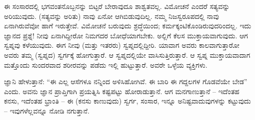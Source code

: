 \vskip 6pt

ಈ ಸಂಸಾರದಲ್ಲಿ ಭಗವಂತನೊಬ್ಬನನ್ನು ಬಿಟ್ಟರೆ ಬೇರಾವುದೂ ಶಾಶ್ವತವಲ್ಲ. ವಿಮೋಚನೆ ಎಂದರೆ ಸತ್ಯವನ್ನು ಅರಿಯುವುದು. (ಸತ್ಯವನ್ನು ಅರಿತು) ನಾವು ಏನೋ ಆಗಿಬಿಡುವುದಿಲ್ಲ. ನಮ್ಮ ನಿಜಸ್ವರೂಪದಲ್ಲಿ ನಾವು ಏನಾಗಿರುವೆವೋ ಹಾಗೆ ಇರುತ್ತೇವೆ. ವಿಮೋಚನೆ ಬರುವುದು ಶ್ರದ್ಧೆಯಿಂದ; ಕರ್ಮಕ್ಕಂಟಿಕೊಂಡಿರುವುದರಿಂದಲ್ಲ. ಇದು ಜ್ಞಾನದ ಪ್ರಶ್ನೆ! ನೀವು ಏನಾಗಿದ್ದೀರೋ ನಿಮಗದರ ಬೋಧೆಯಾಗಬೇಕು. ಅಲ್ಲಿಗೆ ಕೆಲಸ ಮುಕ್ತಾಯವಾಗುವುದು. ಆಗ ಸ್ವಪ್ನವು ಕಳೆಯುವುದು. ಈಗ ನೀವು (ಮತ್ತು ಇತರರು) ಸ್ವಪ್ನದಲ್ಲಿದ್ದೀರಿ. ಯಾವಾಗ ಅವರು ಕಾಲವಾಗುತ್ತಾರೋ ಅವರು ತಮ್ಮ (ಸ್ವಪ್ನದ) ಸ್ವರ್ಗಕ್ಕೆ ಹೋಗುತ್ತಾರೆ. ಆ ಸ್ವಪ್ನದಲ್ಲಿಯೇ ವಾಸಿಸುತ್ತಿರುತ್ತಾರೆ. ಆ ಸ್ವಪ್ನ ಮುಕ್ತಾಯವಾದಾಗ ಮತ್ತೊಂದು ಸುಂದರವಾದ ಶರೀರವನ್ನು ಪಡೆದು ಇಲ್ಲಿ ಹುಟ್ಟುತ್ತಾರೆ. ಅವರೇ ಒಳ್ಳೆಯ ವ್ಯಕ್ತಿಗಳು.

\vskip 6pt

ಜ್ಞಾನಿ ಹೇಳುತ್ತಾನೆ: “ಈ ಎಲ್ಲ ಆಸೆಗಳೂ ನನ್ನಿಂದ ಅಳಿಸಿಹೋಗಿವೆ. ಈ ಬಾರಿ ಈ ಗದ್ದಲಗಳ ಗೊಡವೆಯೇ ಬೇಡ'' ಎಂದು. ಅವನು ಜ್ಞಾನ ಪ್ರಾಪ್ತಿಗಾಗಿ ಪ್ರಯತ್ನಿಸಿ ಕಷ್ಟಪಟ್ಟು ಹೋರಾಡುತ್ತಾನೆ. ಆಗ ಮನಗಾಣುತ್ತಾನೆ – ಇದೆಂತಹ ಕನಸು, ಇದೆಂತಹ ಭ್ರಾಂತಿ – ಈ (ಕನಸು ಕಾಣುವುದು) ಸ್ವರ್ಗ, ಸಂಸಾರ, ಇನ್ನೂ ಅನಿಷ್ಟವಾದುವುಗಳನ್ನು ಕಟ್ಟುವುದು – ಇವುಗಳೆಲ್ಲವನ್ನೂ ನೋಡಿ ನಗುತ್ತಾನೆ.

